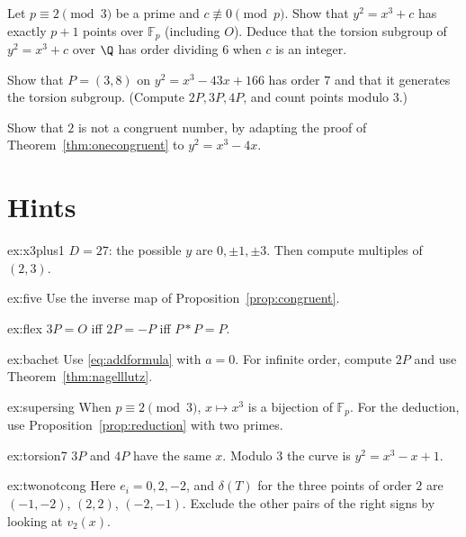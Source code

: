\begin{exercise}[$\star\star$]\label{ex:supersing}
Let $p\equiv2\pmod3$ be a prime and $c\not\equiv0\pmod p$. Show that $y^2=x^3+c$ has exactly $p+1$ points over $\mathbb F_p$ (including $O$). Deduce that the torsion
subgroup of $y^2=x^3+c$ over $\Q$ has order dividing $6$ when $c$ is an integer.
\end{exercise}

\begin{exercise}[$\star\star$]\label{ex:torsion7}
Show that $P=(3,8)$ on $y^2=x^3-43x+166$ has order $7$ and that it generates the torsion subgroup. (Compute $2P,3P,4P$, and count points modulo $3$.)
\end{exercise}

\begin{exercise}[$\star\star\star$]\label{ex:twonotcong}
Show that $2$ is not a congruent number, by adapting the proof of Theorem~\ref{thm:onecongruent} to $y^2=x^3-4x$.
\end{exercise}

\section{Hints}

\begin{hint}{ex:x3plus1}
$D=27$: the possible $y$ are $0,\pm1,\pm3$. Then compute multiples of $(2,3)$.
\end{hint}
\begin{hint}{ex:five}
Use the inverse map of Proposition~\ref{prop:congruent}.
\end{hint}
\begin{hint}{ex:flex}
$3P=O$ iff $2P=-P$ iff $P*P=P$.
\end{hint}
\begin{hint}{ex:bachet}
Use \eqref{eq:addformula} with $a=0$. For infinite order, compute $2P$ and use Theorem~\ref{thm:nagelllutz}.
\end{hint}
\begin{hint}{ex:supersing}
When $p\equiv2\pmod3$, $x\mapsto x^3$ is a bijection of $\mathbb F_p$. For the deduction, use Proposition~\ref{prop:reduction} with two primes.
\end{hint}
\begin{hint}{ex:torsion7}
$3P$ and $4P$ have the same $x$. Modulo $3$ the curve is $y^2=x^3-x+1$.
\end{hint}
\begin{hint}{ex:twonotcong}
Here $e_i=0,2,-2$, and $\delta(T)$ for the three points of order $2$ are $(-1,-2)$, $(2,2)$, $(-2,-1)$. Exclude the other pairs of the right signs by looking at
$v_2(x)$.
\end{hint}

